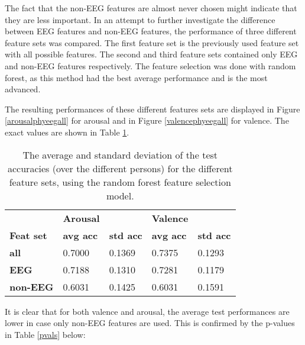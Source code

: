 The fact that the non-EEG features are almost never chosen might indicate that they are less important. In an attempt to further investigate the difference between EEG features and non-EEG features, the performance of three different feature sets was compared. The first feature set is the previously used feature set with all possible features. The second and third feature sets contained only EEG and non-EEG features respectively. The feature selection was done with random forest, as this method had the best average performance and is the most advanced. 

\npar

The resulting performances of these different features sets are displayed in Figure \ref{arousalphyeegall} for arousal and in Figure \ref{valencephyeegall} for valence. The exact values are shown in Table \ref{phyeegalltable}.



\begin{table}[H]
\centering
\caption{The average and standard deviation of the test accuracies (over the different persons) for the different feature sets, using the random forest feature selection model.\label{phyeegalltable}}
\begin{tabular}{l|ll|ll}
         & \textbf{Arousal} &         & \textbf{Valence} &         \\
\textbf{Feat set} & \textbf{avg acc} & \textbf{std acc} & \textbf{avg acc} & \textbf{std acc} \\ \hline 
\textbf{all}      & 0.7000  & 0.1369  & 0.7375  & 0.1293  \\
\textbf{EEG}      & 0.7188  & 0.1310  & 0.7281  & 0.1179  \\
\textbf{non-EEG}  & 0.6031  & 0.1425  & 0.6031  & 0.1591 
\end{tabular}
\end{table}

It is clear that for both valence and arousal, the average test performances are lower in case only non-EEG features are used. This is confirmed by the p-values in Table \ref{pvals} below:

